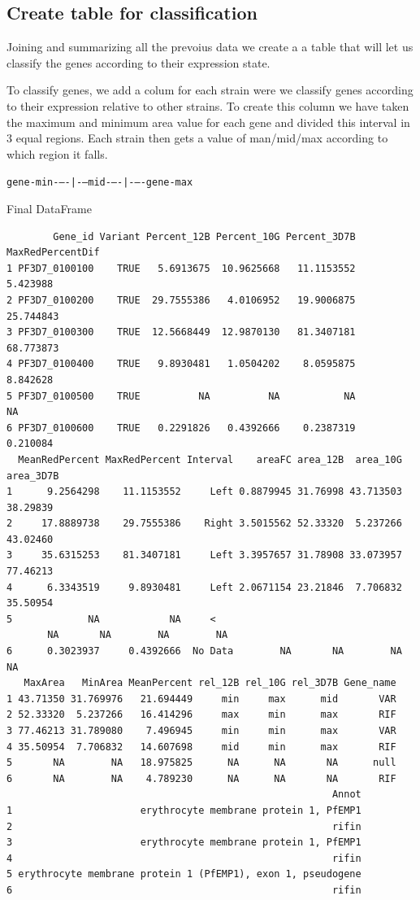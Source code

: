 \documentclass[11pt]{article}
\begin{document}
\subsection{Create table for classification}
\label{sec:orgd7ff2b9}

Joining and summarizing all the prevoius data we create a a table that will let us classify the genes according to their expression state.

To classify genes, we add a colum for each strain were we classify genes according to their expression relative to other strains.
To create this column we have taken the maximum and minimum area value for each gene and divided this interval in 3 equal regions. Each strain then gets a value of man/mid/max according to which region it falls.

\texttt{gene-min-{}--{}-|-{}--mid-{}--{}-|-{}--{}-gene-max}

Final DataFrame
\begin{verbatim}
        Gene_id Variant Percent_12B Percent_10G Percent_3D7B MaxRedPercentDif
1 PF3D7_0100100    TRUE   5.6913675  10.9625668   11.1153552         5.423988
2 PF3D7_0100200    TRUE  29.7555386   4.0106952   19.9006875        25.744843
3 PF3D7_0100300    TRUE  12.5668449  12.9870130   81.3407181        68.773873
4 PF3D7_0100400    TRUE   9.8930481   1.0504202    8.0595875         8.842628
5 PF3D7_0100500    TRUE          NA          NA           NA               NA
6 PF3D7_0100600    TRUE   0.2291826   0.4392666    0.2387319         0.210084
  MeanRedPercent MaxRedPercent Interval    areaFC area_12B  area_10G area_3D7B
1      9.2564298    11.1153552     Left 0.8879945 31.76998 43.713503  38.29839
2     17.8889738    29.7555386    Right 3.5015562 52.33320  5.237266  43.02460
3     35.6315253    81.3407181     Left 3.3957657 31.78908 33.073957  77.46213
4      6.3343519     9.8930481     Left 2.0671154 23.21846  7.706832  35.50954
5             NA            NA     <
       NA       NA        NA        NA
6      0.3023937     0.4392666  No Data        NA       NA        NA        NA
   MaxArea   MinArea MeanPercent rel_12B rel_10G rel_3D7B Gene_name
1 43.71350 31.769976   21.694449     min     max      mid       VAR
2 52.33320  5.237266   16.414296     max     min      max       RIF
3 77.46213 31.789080    7.496945     min     min      max       VAR
4 35.50954  7.706832   14.607698     mid     min      max       RIF
5       NA        NA   18.975825      NA      NA       NA      null
6       NA        NA    4.789230      NA      NA       NA       RIF
                                                        Annot
1                      erythrocyte membrane protein 1, PfEMP1
2                                                       rifin
3                      erythrocyte membrane protein 1, PfEMP1
4                                                       rifin
5 erythrocyte membrane protein 1 (PfEMP1), exon 1, pseudogene
6                                                       rifin
\end{verbatim}
\end{document}
